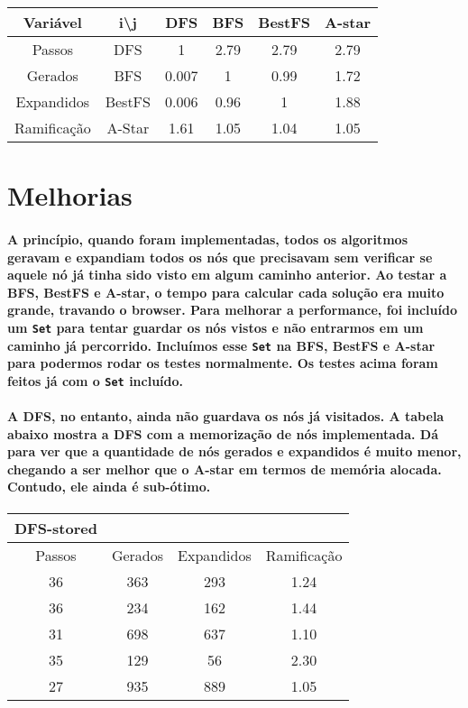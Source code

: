 \documentclass[a4paper,10pt]{article}
\theoremstyle{plain}
\begin{document}
\begin{table}[h]
\begin{center}
\begin{tabular}{*{5}{c|}c}
Variável & i\textbackslash j &  DFS &   BFS &   BestFS &  A-star \\
\hline
Passos  & DFS  & 1 & 2.79 & 2.79 & 2.79 \\ 
Gerados & BFS  & 0.007 & 1 & 0.99 & 1.72 \\
Expandidos & BestFS & 0.006 & 0.96 & 1 & 1.88 \\
Ramificação & A-Star & 1.61 & 1.05  & 1.04 & 1.05 \\
\end{tabular}
\end{center}
\end{table}

\section{Melhorias}

\paragraph{
  A princípio, quando foram implementadas, todos os algoritmos geravam e expandiam todos os nós que
precisavam sem verificar se aquele nó já tinha sido visto em algum caminho anterior. Ao testar
a BFS, BestFS e A-star, o tempo para calcular cada solução era muito grande, travando o browser.
Para melhorar a performance, foi incluído um \texttt{Set} para tentar guardar os nós vistos e não
entrarmos em um caminho já percorrido. Incluímos esse \texttt{Set} na BFS, BestFS e A-star
para podermos rodar os testes normalmente. Os testes acima foram feitos já com o \texttt{Set} 
incluído.
}

\paragraph{
  A DFS, no entanto, ainda não guardava os nós já visitados. A tabela abaixo mostra a DFS com a
memorização de nós implementada. Dá para ver que a quantidade de nós gerados e expandidos é muito
menor, chegando a ser melhor que o A-star em termos de memória alocada. Contudo, ele ainda é
sub-ótimo.
}

\begin{table}[h]
\begin{center}
\begin{tabular}{*{3}{c|}c}
DFS-stored \\
\hline
Passos & Gerados & Expandidos & Ramificação \\
\hline
36 & 363 & 293 & 1.24 \\
36 & 234 & 162 & 1.44 \\
31 & 698 & 637 & 1.10 \\
35 & 129 & 56 & 2.30 \\
27 & 935 & 889 & 1.05 \\
\end{tabular}
\end{center}
\end{table}
\end{document}
